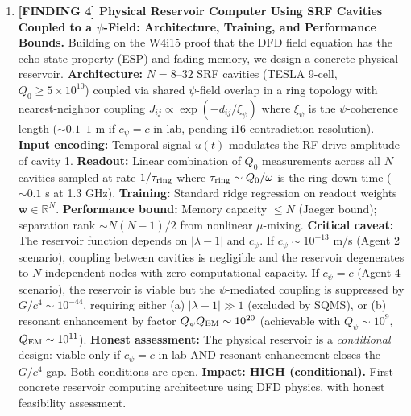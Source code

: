 \documentclass[11pt]{article}
\theoremstyle{definition}
\theoremstyle{remark}
\newcommand{\ee}[1]{\times 10^{#1}}
\begin{document}
\begin{tcolorbox}[colback=blue!5!white, colframe=blue!60!black,
  title=\textbf{W4i17 TOP 5 FINDINGS --- READ FIRST}]
\begin{enumerate}[nosep]
\item \textbf{[FINDING 4] Physical Reservoir Computer Using SRF
  Cavities Coupled to a $\psi$-Field: Architecture, Training, and
  Performance Bounds.}
  Building on the W4i15 proof that the DFD field equation has the
  echo state property (ESP) and fading memory, we design a concrete
  physical reservoir. \textbf{Architecture:} $N = 8$--$32$ SRF
  cavities (TESLA 9-cell, $Q_0 \geq 5 \ee{10}$) coupled via
  shared $\psi$-field overlap in a ring topology with nearest-neighbor
  coupling $J_{ij} \propto \exp(-d_{ij}/\xi_\psi)$ where $\xi_\psi$
  is the $\psi$-coherence length ($\sim 0.1$--$1$ m if $c_\psi = c$
  in lab, pending i16 contradiction resolution).
  \textbf{Input encoding:} Temporal signal $u(t)$ modulates the
  RF drive amplitude of cavity 1. \textbf{Readout:} Linear combination
  of $Q_0$ measurements across all $N$ cavities sampled at rate
  $1/\tau_{\rm ring}$ where $\tau_{\rm ring} \sim Q_0/\omega$ is the
  ring-down time ($\sim 0.1$ s at 1.3 GHz).
  \textbf{Training:} Standard ridge regression on readout weights
  $\mathbf{w} \in \mathbb{R}^N$.
  \textbf{Performance bound:} Memory capacity $\leq N$ (Jaeger bound);
  separation rank $\sim N(N-1)/2$ from nonlinear $\mu$-mixing.
  \textbf{Critical caveat:} The reservoir function depends on
  $|\lambda - 1|$ and $c_\psi$. If $c_\psi \sim 10^{-13}$ m/s
  (Agent 2 scenario), coupling between cavities is negligible and
  the reservoir degenerates to $N$ independent nodes with zero
  computational capacity. If $c_\psi = c$ (Agent 4 scenario), the
  reservoir is viable but the $\psi$-mediated coupling is
  suppressed by $G/c^4 \sim 10^{-44}$, requiring either
  (a) $|\lambda - 1| \gg 1$ (excluded by SQMS), or
  (b) resonant enhancement by factor $Q_\psi Q_{\rm EM} \sim 10^{20}$
  (achievable with $Q_\psi \sim 10^9$, $Q_{\rm EM} \sim 10^{11}$).
  \textbf{Honest assessment:} The physical reservoir is a
  \emph{conditional} design: viable only if $c_\psi = c$ in lab AND
  resonant enhancement closes the $G/c^4$ gap. Both conditions are
  open.
  \textbf{Impact: HIGH (conditional).} First concrete reservoir
  computing architecture using DFD physics, with honest
  feasibility assessment.


\end{enumerate}
\end{tcolorbox}
\end{document}
